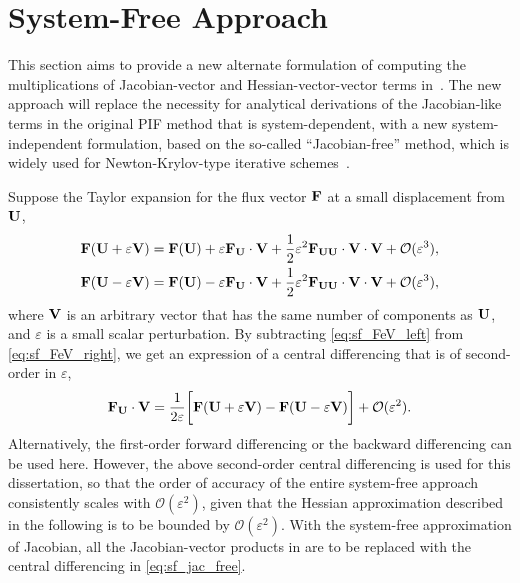 \section{System-Free Approach}\label{sec:original_sf}

This section aims to provide a new alternate formulation of computing
the multiplications of Jacobian-vector and Hessian-vector-vector terms in~.
The new approach will replace the necessity for analytical derivations
of the Jacobian-like terms in the original PIF method that is system-dependent,
with a new system-independent formulation, based on the so-called ``Jacobian-free'' method,
which is widely used for Newton-Krylov-type
iterative schemes~\cite{gear1983iterative,brown1990hybrid,knoll2004jacobian,knoll2011application}.

Suppose the Taylor expansion for the flux vector \( \mathbf{F} \) at a small displacement from \( \mathbf{U} \),
\begin{subequations}\label{eq:sf_FeV}
    \begin{align}
        \label{eq:sf_FeV_right}\mathbf{F} ( \mathbf{U} + \varepsilon \mathbf{V}) =
        \mathbf{F}(\mathbf{U}) + \varepsilon \mathbf{F}_{\mathbf{U}} \cdot \mathbf{V} +
        \frac{1}{2} \varepsilon^{2} \mathbf{F}_{\mathbf{U}\mathbf{U}} \cdot \mathbf{V} \cdot \mathbf{V} + \mathcal{O}(\varepsilon^{3}), \\
        \label{eq:sf_FeV_left}\mathbf{F} ( \mathbf{U} - \varepsilon \mathbf{V}) =
        \mathbf{F}(\mathbf{U}) - \varepsilon \mathbf{F}_{\mathbf{U}} \cdot \mathbf{V} +
        \frac{1}{2} \varepsilon^{2} \mathbf{F}_{\mathbf{U}\mathbf{U}} \cdot \mathbf{V} \cdot \mathbf{V} + \mathcal{O}(\varepsilon^{3}),
    \end{align}
\end{subequations}
where \( \mathbf{V} \) is an arbitrary vector that has
the same number of components as \( \mathbf{U} \), and \( \varepsilon \) is a
small scalar perturbation.
By subtracting \cref{eq:sf_FeV_left} from \cref{eq:sf_FeV_right},
we get an expression of a central differencing that is of second-order in $\varepsilon$,
\begin{equation}\label{eq:sf_jac_free}
    \mathbf{F}_{\mathbf{U}} \cdot \mathbf{V} = \frac{1}{2\varepsilon}
    \bigg[ \mathbf{F}(\mathbf{U} + \varepsilon \mathbf{V}) -\mathbf{F}(\mathbf{U} - \varepsilon \mathbf{V}) \bigg]
    + \mathcal{O} ( \varepsilon^{2} ).
\end{equation}
Alternatively, the first-order forward differencing or the backward differencing can be used here.
However, the above second-order central differencing is used for this dissertation,
so that the order of accuracy of the entire system-free approach consistently scales with \( \mathcal{O}(\varepsilon^{2}) \),
given that the Hessian approximation described in the following is to be bounded by \( \mathcal{O}(\varepsilon^{2}) \).
With the system-free approximation of Jacobian, all the Jacobian-vector products in 
are to be replaced with the central differencing in \cref{eq:sf_jac_free}.

